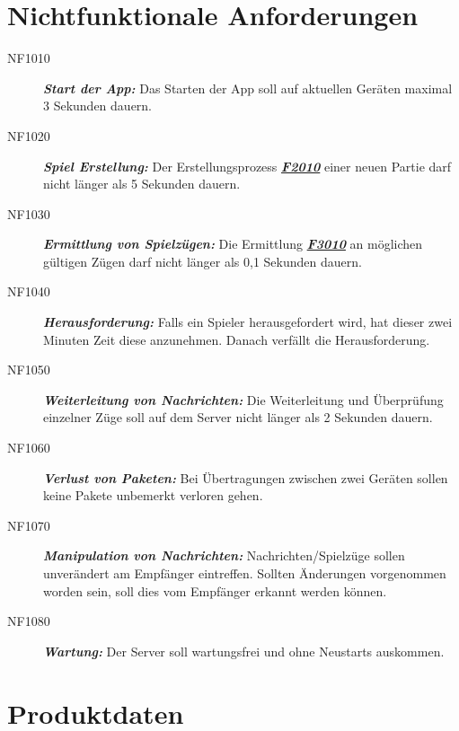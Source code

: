 \documentclass[parskip=full]{scrartcl}
\begin{document}
	\section{Nichtfunktionale Anforderungen}
	\begin{description}
		
		\item[NF1010] \textbf{\textit{Start der App: }} Das Starten der App soll auf aktuellen Geräten maximal 3 Sekunden dauern. 
		\item[NF1020] \textbf{\textit{Spiel Erstellung: }} Der Erstellungsprozess \hyperlink{F2010}{\textbf{\textit{F2010}}} einer neuen Partie darf nicht länger als 5 Sekunden dauern.
		\item[NF1030] \textbf{\textit{Ermittlung von Spielzügen: }} Die Ermittlung \hyperlink{F3010}{\textbf{\textit{F3010}}} an möglichen gültigen Zügen darf nicht länger als 0,1 Sekunden dauern.
		\item[NF1040] \textbf{\textit{Herausforderung: }} Falls ein Spieler herausgefordert wird, hat dieser zwei Minuten Zeit diese anzunehmen. Danach verfällt die Herausforderung. 
		\item[NF1050] \textbf{\textit{Weiterleitung von Nachrichten: }} Die Weiterleitung und Überprüfung einzelner Züge soll auf dem Server nicht länger als 2 Sekunden dauern.
		\item[NF1060] \textbf{\textit{Verlust von Paketen: }} Bei Übertragungen zwischen zwei Geräten sollen keine Pakete unbemerkt verloren gehen.
		\item[NF1070] \textbf{\textit{Manipulation von Nachrichten: }} Nachrichten/Spielzüge sollen unverändert am Empfänger eintreffen. Sollten Änderungen vorgenommen worden sein, soll dies vom Empfänger erkannt werden können.
		\item[NF1080] \textbf{\textit{Wartung: }} Der Server soll wartungsfrei und ohne Neustarts auskommen.
		
		
	\end{description}
	
	\newpage
	\section{Produktdaten}
	
\end{document}
